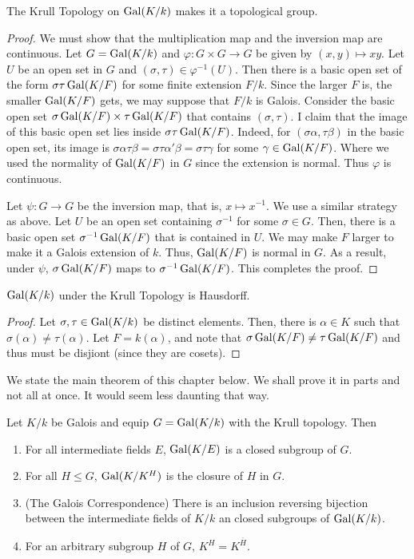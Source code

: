 \begin{theorem}
    The Krull Topology on $\operatorname{Gal}(K/k)$ makes it a topological group.
\end{theorem}
\begin{proof}
    We must show that the multiplication map and the inversion map are continuous. Let $G = \operatorname{Gal}(K/k)$ and $\varphi: G\times G\to G$ be given by $(x,y)\mapsto xy$. Let $U$ be an open set in $G$ and $(\sigma,\tau)\in\varphi^{-1}(U)$. Then there is a basic open set of the form $\sigma\tau\operatorname{Gal}(K/F)$ for some finite extension $F/k$. Since the larger $F$ is, the smaller $\operatorname{Gal}(K/F)$ gets, we may suppose that $F/k$ is Galois. Consider the basic open set $\sigma\operatorname{Gal}(K/F)\times\tau\operatorname{Gal}(K/F)$ that contains $(\sigma,\tau)$. I claim that the image of this basic open set lies inside $\sigma\tau\operatorname{Gal}(K/F)$. Indeed, for $(\sigma\alpha,\tau\beta)$ in the basic open set, its image is $\sigma\alpha\tau\beta = \sigma\tau\alpha'\beta = \sigma\tau\gamma$ for some $\gamma\in\operatorname{Gal}(K/F)$. Where we used the normality of $\operatorname{Gal}(K/F)$ in $G$ since the extension is normal. Thus $\varphi$ is continuous.

    Let $\psi: G\to G$ be the inversion map, that is, $x\mapsto x^{-1}$. We use a similar strategy as above. Let $U$ be an open set containing $\sigma^{-1}$ for some $\sigma\in G$. Then, there is a basic open set $\sigma^{-1}\operatorname{Gal}(K/F)$ that is contained in $U$. We may make $F$ larger to make it a Galois extension of $k$. Thus, $\operatorname{Gal}(K/F)$ is normal in $G$. As a result, under $\psi$, $\sigma\operatorname{Gal}(K/F)$ maps to $\sigma^{-1}\operatorname{Gal}(K/F)$. This completes the proof.
\end{proof}

\begin{proposition}
    $\operatorname{Gal}(K/k)$ under the Krull Topology is Hausdorff.
\end{proposition}
\begin{proof}
    Let $\sigma,\tau\in\operatorname{Gal}(K/k)$ be distinct elements. Then, there is $\alpha\in K$ such that $\sigma(\alpha)\ne\tau(\alpha)$. Let $F = k(\alpha)$, and note that $\sigma\operatorname{Gal}(K/F)\ne\tau\operatorname{Gal}(K/F)$ and thus must be disjiont (since they are cosets). 
\end{proof}

We state the main theorem of this chapter below. We shall prove it in parts and not all at once. It would seem less daunting that way.

\begin{theorem}[Krull]
    Let $K/k$ be Galois and equip $G = \operatorname{Gal}(K/k)$ with the Krull topology. Then 
    \begin{enumerate}[label=(\alph*)]
        \item For all intermediate fields $E$, $\operatorname{Gal}(K/E)$ is a closed subgroup of $G$.
        \item For all $H\le G$, $\operatorname{Gal}(K/K^H)$ is the closure of $H$ in $G$.
        \item (The Galois Correspondence) There is an inclusion reversing bijection between the intermediate fields of $K/k$ an closed subgroups of $\operatorname{Gal}(K/k)$.
        \item For an arbitrary subgroup $H$ of $G$, $K^H = K^{\overline H}$.
    \end{enumerate}
\end{theorem}

